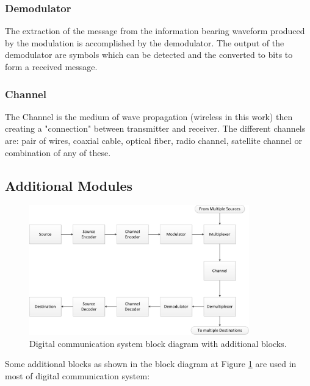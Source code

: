 \subsubsection{Demodulator}

The extraction of the message from the information bearing waveform produced by
the modulation is accomplished by the demodulator. The output of the demodulator
are symbols which can be detected and the converted to bits to form a received
message.

\subsubsection{Channel}

The Channel is the medium of wave propagation (wireless in this work) then
creating a "connection" between transmitter and receiver. The different channels
are: pair of wires, coaxial cable, optical fiber, radio channel, satellite
channel or combination of any of these.

\subsection{Additional Modules}

\begin{figure}[htbp]
    \centering
    \includegraphics[width=0.85\textwidth]{./figures/digicom_plus}
    \caption{ Digital communication system block diagram with additional blocks.
    \label{fig:digicomplus}}
\end{figure}

Some additional blocks as shown in the block diagram  at Figure \ref{fig:digicomplus}
are used in most of digital communication system:

